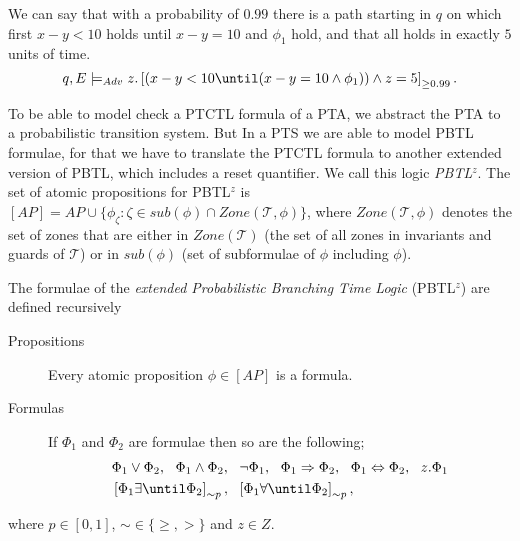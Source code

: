 \begin{ex}
\label{ex:ptctl}
We can say that with a probability of $0.99$ there is a path starting in $q$ on which first $x-y<10$ holds until $x-y=10$ and $\phi_{1}$ hold, and that all holds in exactly $5$ units of time.
\[
q,E\models_{Adv} z.\left[(x-y<10\until(x-y=10\land\phi_{1}))\land z=5\right]_{\geq0.99}.
\]
\end{ex}
To be able to model check a PTCTL formula of a PTA, we abstract the PTA to a probabilistic transition system. But In a PTS we are able to model PBTL formulae, for that we have to translate the PTCTL formula to another extended version of PBTL, which includes a reset quantifier. We call this logic \emph{PBTL$^{z}$}.
The set of atomic propositions for PBTL$^{z}$ is $[AP]=AP\cup\{\phi_{\zeta} : \zeta\in sub(\phi)\cap Zone(\mathcal{T},\phi)\}$, where $Zone(\mathcal{T},\phi)$ denotes the set of zones that are either in $Zone(\mathcal{T})$ (the set of all zones in invariants and guards of $\mathcal{T}$) or in $sub(\phi)$ (set of subformulae of $\phi$ including $\phi$).

\begin{defi}
The formulae of the \emph{extended Probabilistic Branching Time Logic} (PBTL$^{z}$) are defined recursively
\begin{description}
    \item[Propositions]{Every atomic proposition $\phi\in[AP]$ is a formula.}
    \item[Formulas]{If $\Phi_{1}$ and $\Phi_{2}$ are formulae then so are the following;
    \begin{align*}
    & \Phi_{1} \lor \Phi_{2},\ \ \Phi_{1} \land \Phi_{2}, \ \ \lnot \Phi_{1}, \ \ \Phi_{1} \Rightarrow \Phi_{2},\ \ \Phi_{1} \Leftrightarrow \Phi_{2},\ \ z.\Phi_{1} \\
    & \left[\Phi_{1} \exists\until \Phi_{2}\right]_{\sim p}, \ \
      \left[\Phi_{1} \forall\until \Phi_{2}\right]_{\sim p},
    \end{align*}}
\end{description}
where $p\in[0,1]$, $\sim\in\{\geq,>\}$ and $z\in Z$.
\end{defi}

